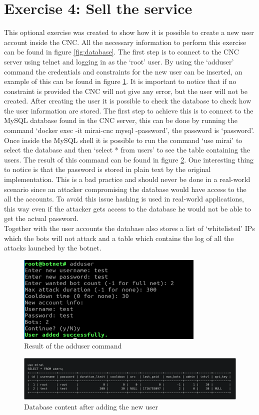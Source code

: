 \section{Exercise 4: Sell the service}
This optional exercise was created to show how it is possible to create a new user account inside the CNC. All the necessary information to perform this exercise can be found in figure \ref{fig:database}. The first step is to connect to the CNC server using telnet and logging in as the `root' user. By using the `adduser' command the credentials and constraints for the new user can be inserted, an example of this can be found in figure \ref{fig:add_user}. It is important to notice that if no constraint is provided the CNC will not give any error, but the user will not be created. After creating the user it is possible to check the database to check how the user information are stored. The first step to achieve this is to connect to the MySQL database found in the CNC server, this can be done by running the command `docker exec -it mirai-cnc mysql -password', the password is `password'. Once inside the MySQL shell it is possible to run the command `use mirai' to select the database and then `select * from users' to see the table containing the users. The result of this command can be found in figure \ref{fig:table_users}. One interesting thing to notice is that the password is stored in plain text by the original implementation. This is a bad practice and should never be done in a real-world scenario since an attacker compromising the database would have access to the all the accounts. To avoid this issue hashing is used in real-world applications, this way even if the attacker gets access to the database he would not be able to get the actual password. \\
Together with the user accounts the database also stores a list of `whitelisted' IPs which the bots will not attack and a table which contains the log of all the attacks launched by the botnet.

\begin{figure}
    \centering
    \includegraphics[width=0.8\textwidth]{resources/images/add_user.png}
    \caption{Result of the adduser command}
    \label{fig:add_user}
\end{figure}

\begin{figure}
    \centering
    \includegraphics[width=1.0\textwidth]{resources/images/table_users.png}
    \caption{Database content after adding the new user}
    \label{fig:table_users}
\end{figure}